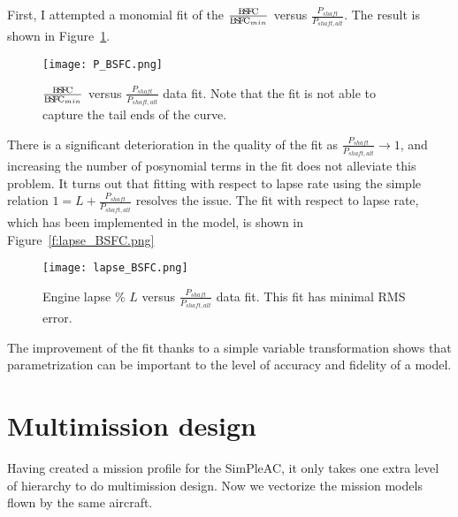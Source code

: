 First, I attempted a monomial fit of the $\frac{{\rm B\!S\!F\!C}}{{\rm B\!S\!F\!C}_{min}}$ versus $\frac{P_{shaft}}{P_{shaft,alt}}$.
The result is shown in Figure~\ref{f:P_BSFC}.

\begin{center}
    \begin{figure}
        \texttt{[image: P\_BSFC.png]}
        \caption{$\frac{{\rm B\!S\!F\!C}}{{\rm B\!S\!F\!C}_{min}}$ versus $\frac{P_{shaft}}{P_{shaft,alt}}$ data fit. Note that the fit is
        not able to capture the tail ends of the curve.}
        \label{f:P_BSFC}
    \end{figure}
\end{center}

There is a significant deterioration in the quality of the fit as $\frac{P_{shaft}}{P_{shaft,alt}} \xrightarrow[]{} 1$,
and increasing the number of posynomial terms in the fit does not alleviate this problem. It
turns out that fitting with respect to lapse rate using the simple relation $1 = L + \frac{P_{shaft}}{P_{shaft,alt}}$
resolves the issue. The fit with respect to lapse rate, which has been implemented in the model, is
shown in Figure~\ref{f:lapse_BSFC.png}

\begin{center}
    \begin{figure}
        \texttt{[image: lapse\_BSFC.png]}
        \caption{Engine lapse \% $L$ versus $\frac{P_{shaft}}{P_{shaft,alt}}$ data fit. This fit has minimal
        RMS error.}
        \label{f:lapse_BSFC}
    \end{figure}
\end{center}

The improvement of the fit thanks to a simple variable transformation shows that
parametrization can be important to the level of accuracy and fidelity of a model.

\section{Multimission design}
\label{s:multimission}

Having created a mission profile for the SimPleAC, it only takes one extra level of
hierarchy to do multimission design. Now we vectorize the mission models flown by the same aircraft.

